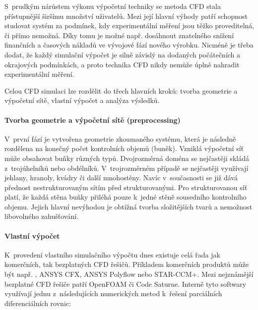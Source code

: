 S~prudkým nárůstem výkonu výpočetní techniky se metoda CFD stala přístupnější širšímu množství uživatelů. Mezi její hlavní výhody patří schopnost studovat systém za podmínek, kdy experimentální měření jsou těžko proveditelná, či přímo nemožná. Díky tomu je možné např. dosáhnout znatelného snížení finančních a časových nákladů ve vývojové fází nového výrobku. Nicméně je třeba dodat, že každý simulační výpočet je silně závislý na dodaných počátečních a okrajových podmínkách, a proto technika CFD nikdy nemůže úplně nahradit experimentální měření.

Celou CFD simulaci lze rozdělit do třech hlavních kroků: tvorba geometrie a vý\-po\-čet\-ní sítě, vlastní výpočet a analýza výsledků.

\paragraph{Tvorba geometrie a výpočetní sítě (preprocessing)}
V~první fází je vytvořena geometrie zkoumaného systému, která je následně rozdělena na konečný počet kontrolních objemů (buněk). Vzniklá výpočetní síť může obsahovat buňky různých typů. Dvojrozměrná doména se nejčastěji skládá z~trojúhelníků nebo obdélníků. V~trojrozměrném případě se nejčastěji využívají jehlany, hranoly, kvádry či další mnohostěny. Navíc v~současnosti se již dává přednost nestrukturovaným sítím před strukturovanými. Pro strukturovanou síť platí, že každá stěna buňky přiléhá pouze k~jedné stěně sousedního kontrolního objemu. Jejich hlavní nevýhodou je obtížná tvorba složitějších tvarů a nemožnost libovolného zahušťování.

\paragraph{Vlastní výpočet}
K~provedení vlastního simulačního výpočtu dnes existuje celá řada jak komerčních, tak bezplatných CFD řešičů. Příkladem komerčních produktů může být např. \flu, ANSYS CFX,  ANSYS Polyflow nebo STAR-CCM+. Mezi nejznámější bezplatné CFD řešiče patří OpenFOAM či Code Saturne. Interně tyto softwary využívají jednu z~následujících numerických metod k~řešení parciálních diferenciálních rovnic:

